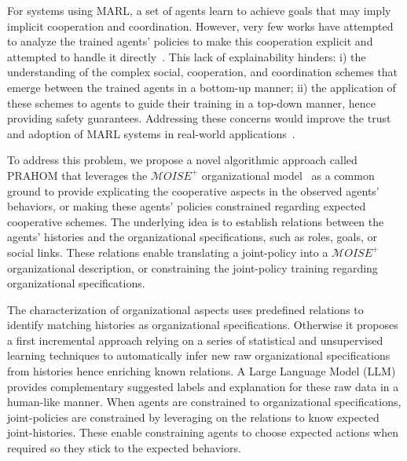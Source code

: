 \documentclass{ecai}
\newcounter{relation}
\begin{document}
For systems using MARL, a set of agents learn to achieve goals that may imply implicit cooperation and coordination. However, very few works have attempted to analyze the trained agents' policies to make this cooperation explicit and attempted to handle it directly~\citep{albrecht2018survey,perolat2017pool}. This lack of explainability hinders: \quad i) the understanding of the complex social, cooperation, and coordination schemes that emerge between the trained agents in a bottom-up manner; \quad ii) the application of these schemes to agents to guide their training in a top-down manner, hence providing safety guarantees.
Addressing these concerns would improve the trust and adoption of MARL systems in real-world applications~\citep{kok2006collaborative,omidshafiei2019learning}.


To address this problem, we propose a novel algorithmic approach called PRAHOM that leverages the $\mathcal{M}OISE^+$ organizational model~\citep{hubner2007moise} as a common ground to provide explicating the cooperative aspects in the observed agents' behaviors, or making these agents' policies constrained regarding expected cooperative schemes. The underlying idea is to establish relations between the agents' histories and the organizational specifications, such as roles, goals, or social links. These relations enable translating a joint-policy into a $\mathcal{M}OISE^+$ organizational description, or constraining the joint-policy training regarding organizational specifications.

The characterization of organizational aspects uses predefined relations to identify matching histories as organizational specifications. Otherwise it proposes a first incremental approach relying on a series of statistical and unsupervised learning techniques to automatically infer new raw organizational specifications from histories hence enriching known relations. A Large Language Model (LLM) provides complementary suggested labels and explanation for these raw data in a human-like manner.
When agents are constrained to organizational specifications, joint-policies are constrained by leveraging on the relations to know expected joint-histories. These enable constraining agents to choose expected actions when required so they stick to the expected behaviors.
\end{document}
